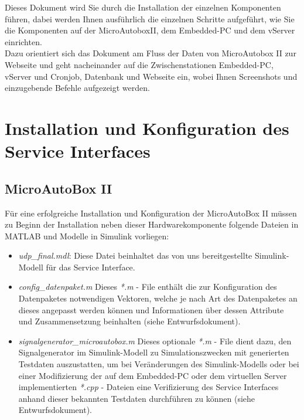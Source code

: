 \documentclass[fontsize = 12pt, paper = a4]{scrreprt}
\begin{document}
Dieses Dokument wird Sie durch die Installation der 
einzelnen Komponenten führen, dabei werden Ihnen ausführlich 
die einzelnen Schritte aufgeführt, wie Sie die Komponenten 
auf der MicroAutoboxII, dem Embedded-PC und dem vServer 
einrichten. \\
Dazu orientiert sich das Dokument am Fluss der 
Daten von MicroAutobox II zur Webseite und geht nacheinander 
auf die Zwischenstationen Embedded-PC, vServer und Cronjob, 
Datenbank und Webseite ein, wobei Ihnen Screenshots und 
einzugebende Befehle aufgezeigt werden.


\chapter{Installation und Konfiguration des Service Interfaces}



\section{MicroAutoBox II}

Für eine erfolgreiche Installation und Konfiguration der MicroAutoBox II müssen zu Beginn der Installation neben dieser Hardwarekomponente folgende Dateien in MATLAB und Modelle in Simulink vorliegen:

\begin{itemize}

\item \textit{udp\_final.mdl}: Diese Datei beinhaltet das von uns bereitgestellte Simulink-Modell für das Service Interface.

\item \textit{config\_datenpaket.m} Dieses \textit{*.m} - File enthält die zur Konfiguration des Datenpaketes notwendigen Vektoren, welche je nach Art des Datenpaketes an dieses angepasst werden können und Informationen über dessen Attribute und Zusammensetzung beinhalten (siehe Entwurfsdokument).

\item \textit{signalgenerator\_microautobox.m} Dieses optionale \textit{*.m} - File dient dazu, den Signalgenerator im Simulink-Modell zu Simulationszwecken mit generierten Testdaten auszustatten, um bei Veränderungen des Simulink-Modells oder bei einer Modifizierung der   auf dem Embedded-PC oder dem virtuellen Server implementierten \textit{*.cpp} - Dateien eine Verifizierung des Service Interfaces anhand dieser bekannten Testdaten durchführen zu können (siehe Entwurfsdokument).

\end{itemize} 
\end{document}
